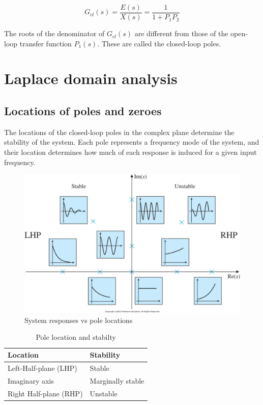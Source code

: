 \begin{equation}
  G_{cl}(s) = \frac{E(s)}{X(s)} = \frac{1}{1 + P_1 P_2}
\end{equation}

The roots of the denominator of $G_{cl}(s)$ are different from those of the
open-loop transfer function $P_1(s)$. These are called the closed-loop poles.

\section{Laplace domain analysis}

\subsection{Locations of poles and zeroes}

The locations of the closed-loop poles in the complex plane determine the
stability of the \gls{system}. Each pole represents a frequency mode of the
\gls{system}, and their location determines how much of each response is induced
for a given input frequency.

\begin{figure}[H]
  \includegraphics[width=\linewidth]{figs/ResponseVsPoleLocations.png}
  \caption{System responses vs pole locations \cite{bib:pole_locations}}
\end{figure}

\begin{table}
  \caption{Pole location and stabilty}
  \renewcommand{\arraystretch}{1.5}
  \centering
  \begin{tabular}{|ll|}
    \hline
    \rowcolor{lightblue}
    \textbf{Location} & \textbf{Stability} \\
    \hline
    Left-Half-plane (LHP) & Stable \\
    Imaginary axis & Marginally stable \\
    Right Half-plane (RHP) & Unstable \\
    \hline
  \end{tabular}
  \label{tab:pole_locations}
\end{table}

